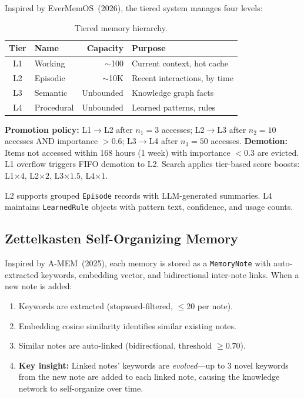 \documentclass[11pt,twocolumn]{article}
\begin{document}
Inspired by EverMemOS~(2026), the tiered system manages four levels:

\begin{table}[h]
\centering\small
\begin{tabular}{@{}clrl@{}}
\toprule
\textbf{Tier} & \textbf{Name} & \textbf{Capacity} & \textbf{Purpose} \\
\midrule
L1 & Working   & $\sim$100    & Current context, hot cache \\
L2 & Episodic  & $\sim$10K    & Recent interactions, by time \\
L3 & Semantic  & Unbounded    & Knowledge graph facts \\
L4 & Procedural& Unbounded   & Learned patterns, rules \\
\bottomrule
\end{tabular}
\caption{Tiered memory hierarchy.}
\end{table}

\textbf{Promotion policy:} L1$\to$L2 after $n_1=3$ accesses; L2$\to$L3 after $n_2=10$ accesses AND importance $>0.6$; L3$\to$L4 after $n_3=50$ accesses. \textbf{Demotion:} Items not accessed within 168 hours (1 week) with importance $<0.3$ are evicted. L1 overflow triggers FIFO demotion to L2. Search applies tier-based score boosts: L1$\times 4$, L2$\times 2$, L3$\times 1.5$, L4$\times 1$.

L2 supports grouped \texttt{Episode} records with LLM-generated summaries. L4 maintains \texttt{LearnedRule} objects with pattern text, confidence, and usage counts.

\subsection{Zettelkasten Self-Organizing Memory}

Inspired by A-MEM~(2025), each memory is stored as a \texttt{MemoryNote} with auto-extracted keywords, embedding vector, and bidirectional inter-note links. When a new note is added:

\begin{enumerate}[nosep]
  \item Keywords are extracted (stopword-filtered, $\leq 20$ per note).
  \item Embedding cosine similarity identifies similar existing notes.
  \item Similar notes are auto-linked (bidirectional, threshold $\geq 0.70$).
  \item \textbf{Key insight:} Linked notes' keywords are \emph{evolved}---up to 3 novel keywords from the new note are added to each linked note, causing the knowledge network to self-organize over time.
\end{enumerate}
\end{document}
